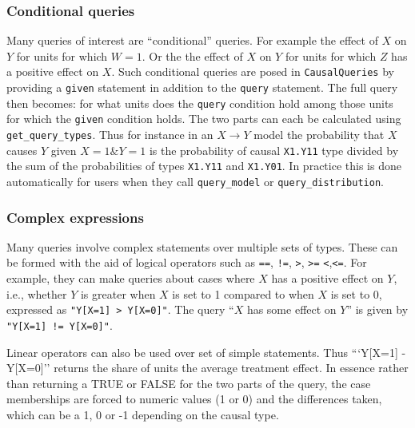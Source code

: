 \documentclass[
  11pt,
  article]{jss}
\begin{document}
\hypertarget{conditional-queries}{%
\subsubsection{Conditional queries}\label{conditional-queries}}

Many queries of interest are ``conditional'' queries. For example the
effect of \(X\) on \(Y\) for units for which \(W= 1\). Or the the effect
of \(X\) on \(Y\) for units for which \(Z\) has a positive effect on
\(X\). Such conditional queries are posed in \texttt{CausalQueries} by
providing a \texttt{given} statement in addition to the \texttt{query}
statement. The full query then becomes: for what units does the
\texttt{query} condition hold among those units for which the
\texttt{given} condition holds. The two parts can each be calculated
using \texttt{get\_query\_types}. Thus for instance in an
\(X \rightarrow Y\) model the probability that \(X\) causes \(Y\) given
\(X=1 \& Y=1\) is the probability of causal \texttt{X1.Y11} type divided
by the sum of the probabilities of types \texttt{X1.Y11} and
\texttt{X1.Y01}. In practice this is done automatically for users when
they call \texttt{query\_model} or \texttt{query\_distribution}.

\hypertarget{complex-expressions}{%
\subsubsection{Complex expressions}\label{complex-expressions}}

Many queries involve complex statements over multiple sets of types.
These can be formed with the aid of logical operators such as
\texttt{==}, \texttt{!=}, \texttt{\textgreater{}},
\texttt{\textgreater{}=} \texttt{\textless{}},\texttt{\textless{}=}. For
example, they can make queries about cases where \(X\) has a positive
effect on \(Y\), i.e., whether \(Y\) is greater when \(X\) is set to 1
compared to when \(X\) is set to 0, expressed as
\texttt{"Y{[}X=1{]}\ \textgreater{}\ Y{[}X=0{]}"}. The query ``\(X\) has
some effect on \(Y\)'' is given by
\texttt{"Y{[}X=1{]}\ !=\ Y{[}X=0{]}"}.

Linear operators can also be used over set of simple statements. Thus
```Y{[}X=1{]} - Y{[}X=0{]}'' returns the share of units the average
treatment effect. In essence rather than returning a TRUE or FALSE for
the two parts of the query, the case memberships are forced to numeric
values (1 or 0) and the differences taken, which can be a 1, 0 or -1
depending on the causal type.
\end{document}
